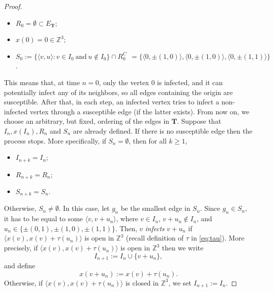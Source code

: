 \documentclass[10pt,a4paper]{amsart}
\newcommand{\Z}{\mathbb{Z}}
\begin{document}
\begin{proof}
\begin{itemize}
    \item $R_0 = \emptyset \subset E_{\mathbf{T}}$;
    
    \item $x(0) = 0 \in \Z^{3}$;
    
    \item $S_0 := \{ \langle v, u \rangle : v \in I_{0} \: \mbox{and} \: u \notin I_{0} \} \cap R_{0}^C \:\: = \{ \langle 0, \pm (1,0)\rangle, \langle 0,\pm (1,0)\rangle ,\langle 0,\pm (1,1)\rangle \}$. 
\end{itemize}

This means that, at time $n=0$, only the vertex $0$ is infected, and it can potentially infect any of its neighbors, so all edges containing the origin are susceptible. After that, in each step, an infected vertex tries to infect a non-infected vertex through a susceptible edge (if the latter exists). From now on, we choose an arbitrary, but fixed, ordering of the edges in $\mathbf{T}$. Suppose that $I_n, x(I_n), R_n$ and $S_n$ are already defined. If there is no susceptible edge then the process stops. More specifically, if $S_n = \emptyset$, then for all $k \geq 1$,
    \begin{itemize}
        \item $I_{n+k} = I_n$;
        
        \item $R_{n+k} = R_n$;
        
        \item $S_{n+k} = S_n$.
    \end{itemize}
Otherwise, $S_n \neq \emptyset$. In this case, let $g_n$ be the smallest edge in $S_n$.
Since $g_n \in S_n$, it has to be equal to some $\langle v, v+u_n \rangle$, where $v \in I_n$, $v+u_n \notin I_n$, and $u_n \in \{ \pm (0,1), \pm (1,0), \pm (1,1)\}$. Then, $v$ \textit{infects} $v+u_n$ if $\langle x(v), x(v)+\tau (u_n) \rangle$ is open in $\Z^{3}$ (recall definition of $\tau$ in \eqref{eq:tau}). More precisely, if $\langle x(v), x(v)+\tau (u_n) \rangle$ is open in $\Z^{3}$ then we write
\begin{equation*}
    I_{n+1} := I_n \cup \{v+u_n\},
\end{equation*}
and define
\begin{equation*}
    x(v+u_n) := x(v) + \tau(u_n).
\end{equation*} 
Otherwise, if $\langle x(v), x(v)+ \tau(u_n) \rangle$ is closed in $\Z^{3}$,  we set $I_{n+1}:= I_n$.




\end{proof}
\end{document}
